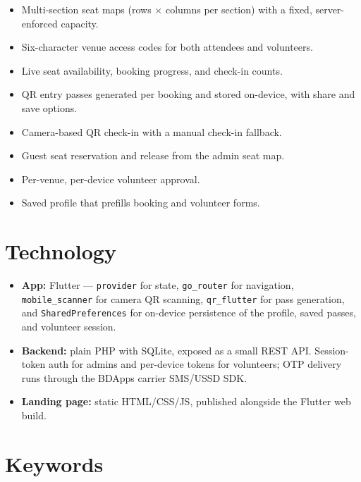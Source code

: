\documentclass[11pt,a4paper]{article}
\begin{document}
\begin{itemize}[leftmargin=1.5em]
    \item Multi-section seat maps (rows $\times$ columns per section) with a
        fixed, server-enforced capacity.
    \item Six-character venue access codes for both attendees and
        volunteers.
    \item Live seat availability, booking progress, and check-in counts.
    \item QR entry passes generated per booking and stored on-device, with
        share and save options.
    \item Camera-based QR check-in with a manual check-in fallback.
    \item Guest seat reservation and release from the admin seat map.
    \item Per-venue, per-device volunteer approval.
    \item Saved profile that prefills booking and volunteer forms.
\end{itemize}

\section{Technology}

\begin{itemize}[leftmargin=1.5em]
    \item \textbf{App:} Flutter --- \texttt{provider} for state,
        \texttt{go\_router} for navigation, \texttt{mobile\_scanner} for
        camera QR scanning, \texttt{qr\_flutter} for pass generation, and
        \texttt{SharedPreferences} for on-device persistence of the profile,
        saved passes, and volunteer session.
    \item \textbf{Backend:} plain PHP with SQLite, exposed as a small REST
        API. Session-token auth for admins and per-device tokens for
        volunteers; OTP delivery runs through the BDApps carrier SMS/USSD
        SDK.
    \item \textbf{Landing page:} static HTML/CSS/JS, published alongside the
        Flutter web build.
\end{itemize}

\section{Keywords}
\end{document}
